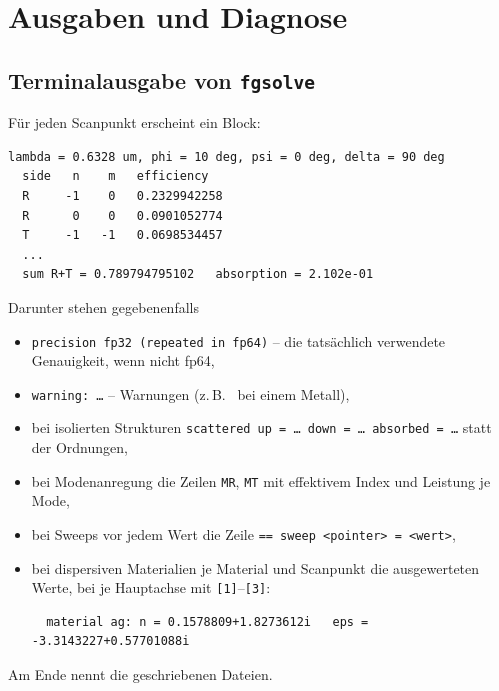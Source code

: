 \chapter{Ausgaben und Diagnose}\label{ch:ausgabe}

\section{Terminalausgabe von \texttt{fgsolve}}
Für jeden Scanpunkt erscheint ein Block:
\begin{lstlisting}
lambda = 0.6328 um, phi = 10 deg, psi = 0 deg, delta = 90 deg
  side   n    m   efficiency
  R     -1    0   0.2329942258
  R      0    0   0.0901052774
  T     -1   -1   0.0698534457
  ...
  sum R+T = 0.789794795102   absorption = 2.102e-01
\end{lstlisting}
Darunter stehen gegebenenfalls
\begin{itemize}
  \item \texttt{precision fp32 (repeated in fp64)} -- die tatsächlich verwendete Genauigkeit, wenn nicht fp64,
  \item \texttt{warning: \ldots} -- Warnungen (z.\,B.\  bei einem Metall),
  \item bei isolierten Strukturen \texttt{scattered up = \ldots{} down = \ldots{} absorbed = \ldots} statt der
        Ordnungen,
  \item bei Modenanregung die Zeilen \texttt{MR}, \texttt{MT} mit effektivem Index und Leistung je Mode,
  \item bei Sweeps vor jedem Wert die Zeile \texttt{== sweep <pointer> = <wert>},
  \item bei dispersiven Materialien je Material und Scanpunkt die ausgewerteten Werte, bei 
        je Hauptachse mit \texttt{[1]}--\texttt{[3]}:
\begin{lstlisting}
  material ag: n = 0.1578809+1.8273612i   eps = -3.3143227+0.57701088i
\end{lstlisting}
\end{itemize}
Am Ende nennt  die geschriebenen Dateien.

